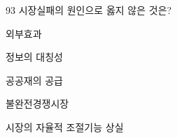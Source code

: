\begin{question}{93}
시장실패의 원인으로 옳지 않은 것은?
\begin{choices}
  \item 외부효과
  \item 정보의 대칭성
  \item 공공재의 공급
  \item 불완전경쟁시장
  \item 시장의 자율적 조절기능 상실
\end{choices}
\end{question}
